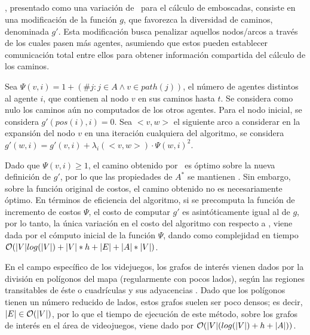 \subsection{\ambush}

\ambush, presentado como una variaci\'on de \astar\ para el c\'alculo
de emboscadas\cite{FGC12e}, consiste en una modificación de la
función $g$, que favorezca la diversidad de caminos, denominada $g'$.
Esta modificaci\'on busca penalizar aquellos nodos/arcos a trav\'es
de los cuales pasen m\'as agentes, a\-su\-mien\-do que estos pueden
establecer comunicaci\'on total entre ellos para
obtener informaci\'on compartida del c\'alculo de los caminos.

Sea $\Psi(v,i) = 1+(\# j : j \in A \wedge v \in path(j))$,
el número de agentes distintos al agente $i$, que contienen al
nodo $v$ en sus caminos hasta $t$. Se considera como nulo los
caminos a\'un no computados de los otros agentes.
Para el nodo inicial, se considera $g'(pos(i),i) = 0$.
Sea $<v,w>$ el si\-guien\-te arco a considerar en la expansión del
nodo $v$ en una iteración cualquiera del algoritmo, se considera
$g'(w, i) = g'(v,i) + \lambda_i(<v,w>) \cdot \Psi(w,i)^2$.

Dado que $\Psi(v,i) \geq 1$, el camino obtenido por \ambush\
es óptimo sobre la nueva definición de $g'$, por lo que las
propiedades de $A^*$ se mantienen \cite{HNR72}. Sin embargo, sobre
la función original de costos, el camino obtenido no es necesariamente
óptimo. En t\'erminos de eficiencia del algoritmo, si se precomputa
la funci\'on de incremento de costos $\Psi$, el costo de computar
$g'$ es asintóticamente igual al de $g$, por lo tanto, la única variación
en el costo del algoritmo con respecto a \astar, viene dada por el cómputo
inicial de la función $\Psi$, dando como complejidad en tiempo
$\mathcal{O}(|V|log(|V|) + |V|*h + |E| + |A|*|V| )$.

En el campo específico de los videjuegos, los grafos
de interés vienen dados por la división en polígonos
del mapa (regularmente con pocos lados), según las
regiones transitables de éste o cuadrículas y sus
adyacencias \cite{MF09} \cite{CS11}.
Dado que los polígonos tienen un número
reducido de lados, estos grafos suelen ser poco densos;
es decir, $|E| \in \mathcal{O}(|V|)$, por lo que el tiempo
de ejecución de este método, sobre los grafos de interés
en el área de videojuegos, viene dado por
$\mathcal{O}(|V|(log(|V|) + h + |A|) )$.

\subsection{\pambush}

